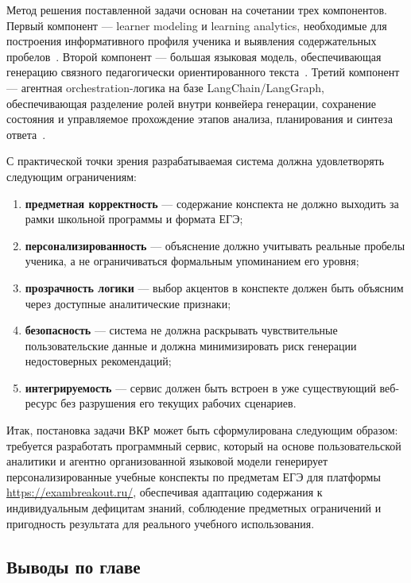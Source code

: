 \documentclass[a4paper,12pt]{extarticle}
\begin{document}
Метод решения поставленной задачи основан на сочетании трех компонентов. Первый компонент --- learner modeling и learning analytics, необходимые для построения информативного профиля ученика и выявления содержательных пробелов~\cite{khor2024la,abdelrahman2023ktsurvey}. Второй компонент --- большая языковая модель, обеспечивающая генерацию связного педагогически ориентированного текста~\cite{kasneci2023chatgpt,shi2025llmedu}. Третий компонент --- агентная orchestration-логика на базе LangChain/LangGraph, обеспечивающая разделение ролей внутри конвейера генерации, сохранение состояния и управляемое прохождение этапов анализа, планирования и синтеза ответа~\cite{langchain2024}.

С практической точки зрения разрабатываемая система должна удовлетворять следующим ограничениям:

\begin{enumerate}
    \item \textbf{предметная корректность} --- содержание конспекта не должно выходить за рамки школьной программы и формата ЕГЭ;
    \item \textbf{персонализированность} --- объяснение должно учитывать реальные пробелы ученика, а не ограничиваться формальным упоминанием его уровня;
    \item \textbf{прозрачность логики} --- выбор акцентов в конспекте должен быть объясним через доступные аналитические признаки;
    \item \textbf{безопасность} --- система не должна раскрывать чувствительные пользовательские данные и должна минимизировать риск генерации недостоверных рекомендаций;
    \item \textbf{интегрируемость} --- сервис должен быть встроен в уже существующий веб-ресурс без разрушения его текущих рабочих сценариев.
\end{enumerate}

Итак, постановка задачи ВКР может быть сформулирована следующим образом: требуется разработать программный сервис, который на основе пользовательской аналитики и агентно организованной языковой модели генерирует персонализированные учебные конспекты по предметам ЕГЭ для платформы \url{https://exambreakout.ru/}, обеспечивая адаптацию содержания к индивидуальным дефицитам знаний, соблюдение предметных ограничений и пригодность результата для реального учебного использования.

\subsection{Выводы по главе}
\end{document}
